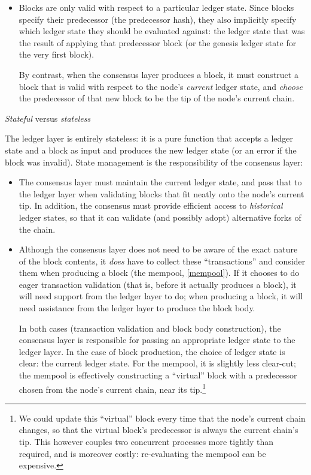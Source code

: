 \begin{description}
\begin{itemize}
\item Blocks are only valid with respect to a particular ledger state. Since
blocks specify their predecessor (the predecessor hash), they also implicitly
specify which ledger state they should be evaluated against: the ledger state
that was the result of applying that predecessor block (or the genesis ledger
state for the very first block).

By contrast, when the consensus layer produces a block, it must construct a
block that is valid with respect to the node's \emph{current} ledger state, and
\emph{choose} the predecessor of that new block to be the tip of the node's
current chain.

\end{itemize}

\item{\emph{Stateful} versus \emph{stateless}}

The ledger layer is entirely stateless: it is a pure function that accepts a
ledger state and a block as input and produces the new ledger state (or an
error if the block was invalid). State management is the responsibility of
the consensus layer:

\begin{itemize}

\item The consensus layer must maintain the current ledger state, and pass that
to the ledger layer when validating blocks that fit neatly onto the node's
current tip. In addition, the consensus must provide efficient access to
\emph{historical} ledger states, so that it can validate (and possibly adopt)
alternative forks of the chain.

\item Although the consensus layer does not need to be aware of the exact nature
of the block contents, it \emph{does} have to collect these ``transactions'' and
consider them when producing a block (the mempool, \cref{mempool}). If it
chooses to do eager transaction validation (that is, before it actually produces
a block), it will need support from the ledger layer to do; when producing a
block, it will need assistance from the ledger layer to produce the block body.

In both cases (transaction validation and block body construction), the
consensus layer is responsible for passing an appropriate ledger state to the
ledger layer. In the case of block production, the choice of ledger state is
clear: the current ledger state. For the mempool, it is slightly less clear-cut;
the mempool is effectively constructing a ``virtual'' block with a predecessor
chosen from the node's current chain, near its tip.\footnote{We could update
this ``virtual'' block every time that the node's current chain changes, so that
the virtual block's predecessor is always the current chain's tip. This however
couples two concurrent processes more tightly than required, and is moreover
costly: re-evaluating the mempool can be expensive.}

\end{itemize}

\end{description}

